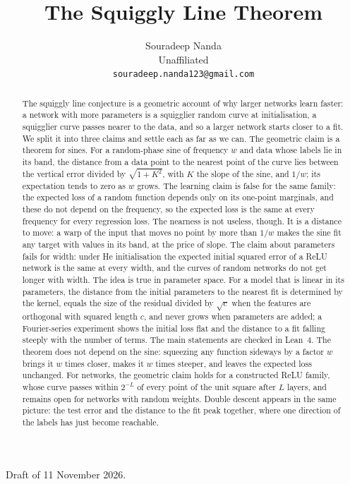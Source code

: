 \documentclass{article}
\title{The Squiggly Line Theorem}
\author{%
  Souradeep Nanda \\
  Unaffiliated \\
  \texttt{souradeep.nanda123@gmail.com}
}
\theoremstyle{plain}
\theoremstyle{definition}
\theoremstyle{remark}
\begin{document}
\maketitle

\begin{center}
\small Draft of 11 November 2026.
\end{center}

\begin{abstract}
The squiggly line conjecture is a geometric account of why larger networks learn
faster: a network with more parameters is a squigglier random curve at
initialisation, a squigglier curve passes nearer to the data, and so a larger
network starts closer to a fit. We split it into three claims and settle each
as far as we can. The geometric claim is a theorem for sines. For a random-phase
sine of frequency $w$ and data whose labels lie in its band, the distance from
a data point to the nearest point of the curve lies between the vertical error
divided by $\sqrt{1+K^2}$, with $K$ the slope of the sine, and $1/w$; its
expectation tends to zero as $w$ grows. The learning claim is false for the same
family: the expected loss of a random function depends only on its one-point
marginals, and these do not depend on the frequency, so the expected loss is
the same at every frequency for every regression loss. The nearness is not
useless, though. It is a distance to move: a warp of the input that moves no
point by more than $1/w$ makes the sine fit any target with values in its band,
at the price of slope. The claim about
parameters fails for width: under He initialisation the expected initial squared
error of a ReLU network is the same at every width, and the curves of random
networks do not get longer with width. The idea is true in parameter space. For
a model that is linear in its parameters, the distance from the initial
parameters to the nearest fit is determined by the kernel, equals the size of
the residual divided by $\sqrt c$ when the features are orthogonal with squared
length $c$, and never grows when parameters are added; a Fourier-series
experiment shows the initial loss flat and the distance to a fit falling
steeply with the number of terms. The main statements are checked in Lean~4.
The theorem does not depend on the sine: squeezing any function sideways by a
factor $w$ brings it $w$ times closer, makes it $w$ times steeper, and leaves
the expected loss unchanged. For networks, the geometric claim holds for a
constructed ReLU family, whose curve passes within $2^{-L}$ of every point of
the unit square after $L$ layers, and remains open for networks with random
weights. Double descent appears in the same picture: the test error and the
distance to the fit peak together, where one direction of the labels has just
become reachable.
\end{abstract}
\end{document}

